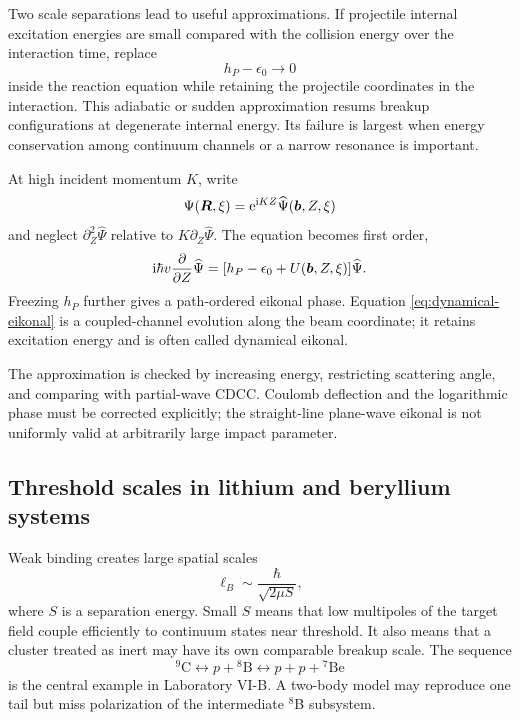 Two scale separations lead to useful approximations.  If projectile internal
excitation energies are small compared with the collision energy over the
interaction time, replace
\begin{equation}
  h_P-\epsilon_0\longrightarrow0
  \label{eq:adiabatic-freezing}
\end{equation}
inside the reaction equation while retaining the projectile coordinates in
the interaction.  This adiabatic or sudden approximation resums breakup
configurations at degenerate internal energy.  Its failure is largest when
energy conservation among continuum channels or a narrow resonance is
important.

At high incident momentum $K$, write
\begin{equation}
  \Psi(\bm R,\xi)
  =\mathrm{e}^{\mathrm{i} KZ}\widehat\Psi(\bm b,Z,\xi)
  \label{eq:eikonal-factorization}
\end{equation}
and neglect $\partial_Z^2\widehat\Psi$ relative to
$K\partial_Z\widehat\Psi$.  The equation becomes first order,
\begin{equation}
  \mathrm{i}\hbar v\frac{\partial}{\partial Z}\widehat\Psi
  =[h_P-\epsilon_0+U(\bm b,Z,\xi)]\widehat\Psi.
  \label{eq:dynamical-eikonal}
\end{equation}
Freezing $h_P$ further gives a path-ordered eikonal phase.  Equation
\eqref{eq:dynamical-eikonal} is a coupled-channel evolution along the beam
coordinate; it retains excitation energy and is often called dynamical
eikonal.

The approximation is checked by increasing energy, restricting scattering
angle, and comparing with partial-wave CDCC.  Coulomb deflection and the
logarithmic phase must be corrected explicitly; the straight-line plane-wave
eikonal is not uniformly valid at arbitrarily large impact parameter.

\subsection{Threshold scales in lithium and beryllium systems}
\label{subsec:li-be-scales}

Weak binding creates large spatial scales
\begin{equation}
  \ell_B\sim\frac{\hbar}{\sqrt{2\mu S}},
  \label{eq:weak-binding-length}
\end{equation}
where $S$ is a separation energy.  Small $S$ means that low multipoles of the
target field couple efficiently to continuum states near threshold.  It also
means that a cluster treated as inert may have its own comparable breakup
scale.  The sequence
\begin{equation}
  {}^9\mathrm C
  \longleftrightarrow p+{}^8\mathrm B
  \longleftrightarrow p+p+{}^7\mathrm{Be}
  \label{eq:9c-threshold-hierarchy}
\end{equation}
is the central example in Laboratory VI-B.  A two-body model may reproduce one
tail but miss polarization of the intermediate $^8$B subsystem.

